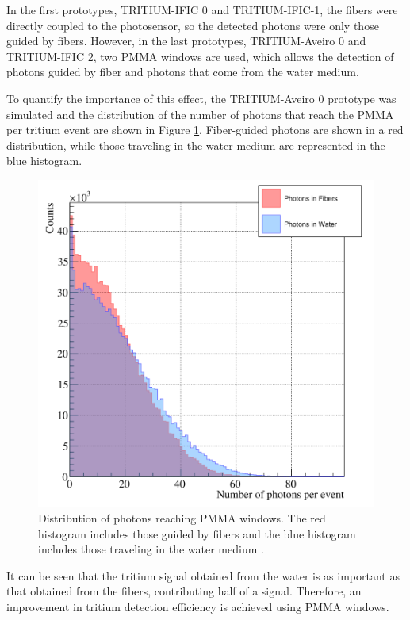 In the first prototypes, TRITIUM-IFIC 0 and TRITIUM-IFIC-1, the fibers were directly coupled to the photosensor, so the detected photons were only those guided by fibers. However, in the last prototypes, TRITIUM-Aveiro 0 and TRITIUM-IFIC 2, two PMMA windows are used, which allows the detection of photons guided by fiber and photons that come from the water medium.

To quantify the importance of this effect, the TRITIUM-Aveiro 0 prototype was simulated and the distribution of the number of photons that reach the PMMA per tritium event are shown in Figure \ref{fig:PMMAEffect}. Fiber-guided photons are shown in a red distribution, while those traveling in the water medium are represented in the blue histogram.

\begin{figure}[h]
\centering
\includegraphics[scale=0.3]{Figures/8SimulationsResults/81TRITIUMDesign/815PMMA/PhotonsDetectedWaterFiber.png}
\caption{Distribution of photons reaching PMMA windows. The red histogram includes those guided by fibers and the blue histogram includes those traveling in the water medium \cite{SimulationPaperCarlos}.\label{fig:PMMAEffect}}
\end{figure}

It can be seen that the tritium signal obtained from the water is as important as that obtained from the fibers, contributing half of a signal. Therefore, an improvement in tritium detection efficiency is achieved using PMMA windows.